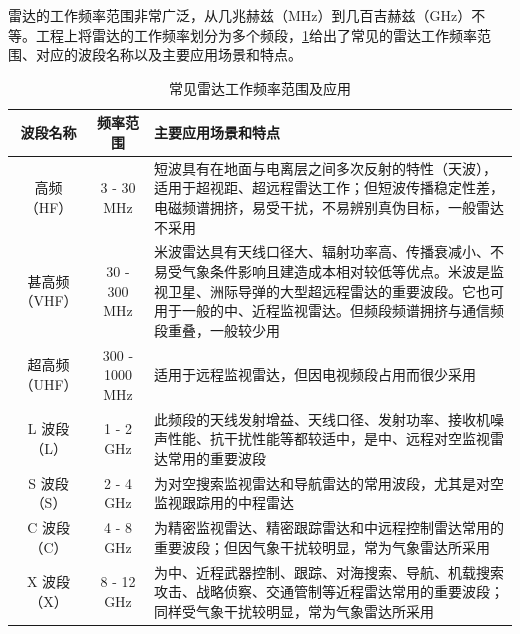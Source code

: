 雷达的工作频率范围非常广泛，从几兆赫兹（MHz）到几百吉赫兹（GHz）不等。工程上将雷达的工作频率划分为多个频段，\cref{tab_chp1_radar_frequency}给出了常见的雷达工作频率范围、对应的波段名称以及主要应用场景和特点。

\begin{table}[htb!]
    \centering
    \caption{常见雷达工作频率范围及应用}
    \label{tab_chp1_radar_frequency}
    \small
    \begin{tabular}{c|c|p{7cm}}
        \hline
        波段名称      & 频率范围           & 主要应用场景和特点                                                                                                     \\
        \hline
        \hline
        高频（HF）    & 3 - 30 MHz     & 短波具有在地面与电离层之间多次反射的特性（天波），适用于超视距、超远程雷达工作；但短波传播稳定性差，电磁频谱拥挤，易受干扰，不易辨别真伪目标，一般雷达不采用
        \\
        \hline
        甚高频（VHF）  & 30 - 300 MHz   & 米波雷达具有天线口径大、辐射功率高、传播衰减小、不易受气象条件影响且建造成本相对较低等优点。米波是监视卫星、洲际导弹的大型超远程雷达的重要波段。它也可用于一般的中、近程监视雷达。但频段频谱拥挤与通信频段重叠，一般较少用 \\
        \hline
        超高频（UHF）  & 300 - 1000 MHz & 适用于远程监视雷达，但因电视频段占用而很少采用                                                                                       \\
        \hline
        L 波段（L）   & 1 - 2 GHz      & 此频段的天线发射增益、天线口径、发射功率、接收机噪声性能、抗干扰性能等都较适中，是中、远程对空监视雷达常用的重要波段                                                    \\
        \hline
        S 波段（S）   & 2 - 4 GHz      & 为对空搜索监视雷达和导航雷达的常用波段，尤其是对空监视跟踪用的中程雷达                                                                           \\
        \hline
        C 波段（C）   & 4 - 8 GHz      & 为精密监视雷达、精密跟踪雷达和中远程控制雷达常用的重要波段；但因气象干扰较明显，常为气象雷达所采用                                                             \\
        \hline
        X 波段（X）   & 8 - 12 GHz     & 为中、近程武器控制、跟踪、对海搜索、导航、机载搜索攻击、战略侦察、交通管制等近程雷达常用的重要波段；同样受气象干扰较明显，常为气象雷达所采用                                        \\
        \hline

\end{tabular}
\end{table}
